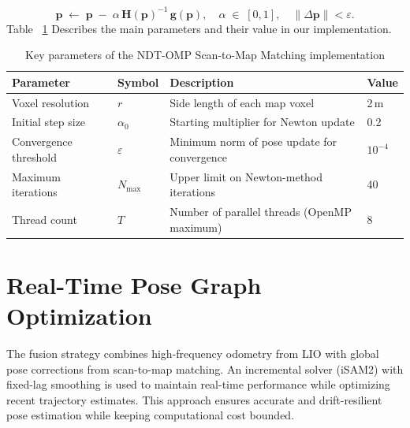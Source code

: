 \begin{equation}
	\label{eq:update}
	\mathbf{p} \;\leftarrow\; \mathbf{p} \;-\; \alpha \,\mathbf{H}(\mathbf{p})^{-1}\,\mathbf{g}(\mathbf{p}),
	\quad
	\alpha \;\in\; [0,1], 
	\quad
	\|\Delta\mathbf{p}\|<\varepsilon.
\end{equation}
Table ~\ref{tab:ndt-omp-params} Describes the main parameters and their value in our implementation.
\begin{table}[ht]
	
	\centering
	\renewcommand{\arraystretch}{1}
	\setlength{\tabcolsep}{2pt}
	\caption{Key parameters of the NDT-OMP Scan-to-Map Matching implementation}
	\label{tab:ndt-omp-params}
	\begin{tabular}{@{}llll@{}}
		\toprule
		\textbf{Parameter}         & \textbf{Symbol}       & \textbf{Description}                                      & \textbf{Value}                          \\ 
		\midrule
		Voxel resolution           & \(r\)                 & Side length of each map voxel                             & 2\,m                                    \\ 
		Initial step size          & \(\alpha_0\)          & Starting multiplier for Newton update                     & 0.2                                    \\ 
		Convergence threshold      & \(\varepsilon\)       & Minimum norm of pose update for convergence                & \(10^{-4}\)                             \\ 
		Maximum iterations         & \(N_{\max}\)          & Upper limit on Newton-method iterations                    & 40                                   \\ 
		Thread count               & \(T\)                 & Number of parallel threads (OpenMP maximum)               & 8       \\ 
		\bottomrule
	\end{tabular}
\end{table}





\section{ Real-Time Pose Graph Optimization }
\label{sec:fusion}

The fusion strategy combines high-frequency odometry from LIO with global pose corrections from scan-to-map matching. An incremental solver (iSAM2) with fixed-lag smoothing is used to maintain real-time performance while optimizing recent trajectory estimates. This approach ensures accurate and drift-resilient pose estimation while keeping computational cost bounded.


